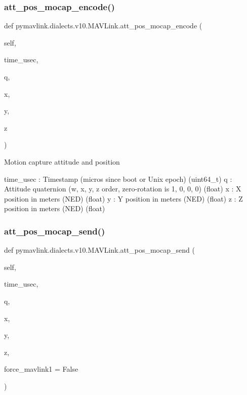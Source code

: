 \subsubsection{\texorpdfstring{att\+\_\+pos\+\_\+mocap\+\_\+encode()}{att\_pos\_mocap\_encode()}}
{\footnotesize\ttfamily def pymavlink.\+dialects.\+v10.\+M\+A\+V\+Link.\+att\+\_\+pos\+\_\+mocap\+\_\+encode (\begin{DoxyParamCaption}\item[{}]{self,  }\item[{}]{time\+\_\+usec,  }\item[{}]{q,  }\item[{}]{x,  }\item[{}]{y,  }\item[{}]{z }\end{DoxyParamCaption})}

\begin{DoxyVerb}Motion capture attitude and position

time_usec                 : Timestamp (micros since boot or Unix epoch) (uint64_t)
q                         : Attitude quaternion (w, x, y, z order, zero-rotation is 1, 0, 0, 0) (float)
x                         : X position in meters (NED) (float)
y                         : Y position in meters (NED) (float)
z                         : Z position in meters (NED) (float)\end{DoxyVerb}
 \mbox{\label{classpymavlink_1_1dialects_1_1v10_1_1MAVLink_a0c2076a3e6de6e2fc4f91d547e3352be}} 
\subsubsection{\texorpdfstring{att\+\_\+pos\+\_\+mocap\+\_\+send()}{att\_pos\_mocap\_send()}}
{\footnotesize\ttfamily def pymavlink.\+dialects.\+v10.\+M\+A\+V\+Link.\+att\+\_\+pos\+\_\+mocap\+\_\+send (\begin{DoxyParamCaption}\item[{}]{self,  }\item[{}]{time\+\_\+usec,  }\item[{}]{q,  }\item[{}]{x,  }\item[{}]{y,  }\item[{}]{z,  }\item[{}]{force\+\_\+mavlink1 = {\ttfamily False} }\end{DoxyParamCaption})}

